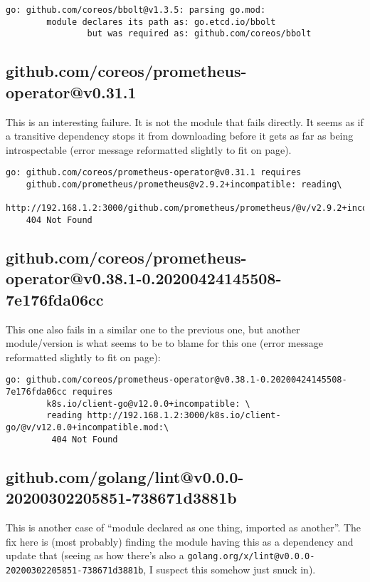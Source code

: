 \documentclass[a4paper]{paper}
\begin{document}
\begin{verbatim}
go: github.com/coreos/bbolt@v1.3.5: parsing go.mod:
        module declares its path as: go.etcd.io/bbolt
                but was required as: github.com/coreos/bbolt
\end{verbatim}

\subsection{github.com/coreos/prometheus-operator@v0.31.1}

This is an interesting failure. It is not the module that fails
directly. It seems as if a transitive dependency stops it from
downloading before it gets as far as being introspectable (error message reformatted slightly to fit on page).

\begin{verbatim}
go: github.com/coreos/prometheus-operator@v0.31.1 requires
    github.com/prometheus/prometheus@v2.9.2+incompatible: reading\
    http://192.168.1.2:3000/github.com/prometheus/prometheus/@v/v2.9.2+incompatible.mod:\
    404 Not Found
\end{verbatim}

\subsection{github.com/coreos/prometheus-operator@v0.38.1-0.20200424145508-7e176fda06cc}

This one also fails in a similar one to the previous one, but another module/version is what seems to be to blame for this one (error message reformatted slightly to fit on page):

\begin{verbatim}
go: github.com/coreos/prometheus-operator@v0.38.1-0.20200424145508-7e176fda06cc requires
        k8s.io/client-go@v12.0.0+incompatible: \
        reading http://192.168.1.2:3000/k8s.io/client-go/@v/v12.0.0+incompatible.mod:\
         404 Not Found
\end{verbatim}

\subsection{github.com/golang/lint@v0.0.0-20200302205851-738671d3881b}

This is another case of ``module declared as one thing, imported as
another''. The fix here is (most probably) finding the module having
this as a dependency and update that (seeing as how there's also a
{\tt golang.org/x/lint@v0.0.0-20200302205851-738671d3881b}, I suspect
this somehow just snuck in).
\end{document}
